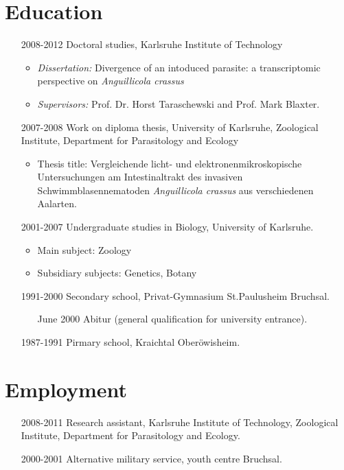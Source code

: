 \section*{Education}

\begin{itemize}
\item [2008-2012] Doctoral studies, Karlsruhe Institute of Technology
  \begin{itemize}
  \item \textit{Dissertation:} Divergence of an intoduced parasite:
    a transcriptomic perspective on \textit{Anguillicola crassus}
  \item \textit{Supervisors:}
    Prof. Dr. Horst Taraschewski and Prof. Mark Blaxter.
  \end{itemize}
\item [2007-2008] Work on diploma thesis, University of Karlsruhe,
  Zoological Institute, Department for Parasitology and Ecology
  \begin{itemize}
  \item Thesis title: Vergleichende licht- und
    elektronenmikroskopische Untersuchungen am Intestinaltrakt des
    invasiven Schwimmblasennematoden \textit{Anguillicola crassus} aus
    verschiedenen Aalarten.
  \end{itemize}
\item [2001-2007] Undergraduate studies in Biology, University of
  Karlsruhe.
  \begin{itemize}
  \item Main subject: Zoology
  \item Subsidiary subjects: Genetics, Botany
  \end{itemize}
\item [1991-2000] Secondary school, Privat-Gymnasium St.Paulusheim
  Bruchsal.
  \begin{itemize}
  \item [June 2000] Abitur (general qualification for university
    entrance).
  \end{itemize}
\item [1987-1991] Pirmary school, Kraichtal Ober\"owisheim.
\end{itemize}

\section*{Employment}

\begin{itemize}
\item [2008-2011] Research assistant, Karlsruhe Institute of
  Technology, Zoological Institute, Department for Parasitology and
  Ecology.
\item [2000-2001] Alternative military service, youth centre Bruchsal.
\end{itemize}

